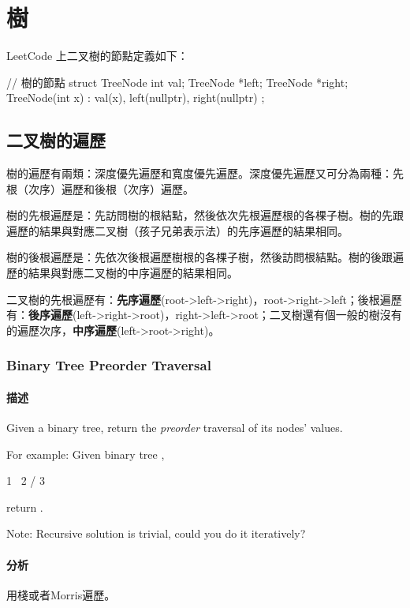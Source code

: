\chapter{樹}

LeetCode 上二叉樹的節點定義如下：
\begin{Code}
// 樹的節點
struct TreeNode {
    int val;
    TreeNode *left;
    TreeNode *right;
    TreeNode(int x) : val(x), left(nullptr), right(nullptr) { }
};
\end{Code}


\section{二叉樹的遍歷} %

樹的遍歷有兩類：深度優先遍歷和寬度優先遍歷。深度優先遍歷又可分為兩種：先根（次序）遍歷和後根（次序）遍歷。

樹的先根遍歷是：先訪問樹的根結點，然後依次先根遍歷根的各棵子樹。樹的先跟遍歷的結果與對應二叉樹（孩子兄弟表示法）的先序遍歷的結果相同。

樹的後根遍歷是：先依次後根遍歷樹根的各棵子樹，然後訪問根結點。樹的後跟遍歷的結果與對應二叉樹的中序遍歷的結果相同。

二叉樹的先根遍歷有：\textbf{先序遍歷}(root->left->right)，root->right->left；後根遍歷有：\textbf{後序遍歷}(left->right->root)，right->left->root；二叉樹還有個一般的樹沒有的遍歷次序，\textbf{中序遍歷}(left->root->right)。


\subsection{Binary Tree Preorder Traversal}
\label{sec:binary-tree-preorder-traversal}


\subsubsection{描述}
Given a binary tree, return the \emph{preorder} traversal of its nodes' values.

For example:
Given binary tree ,
\begin{Code}
 1
  \
   2
  /
 3
\end{Code}
return \code{\[1,2,3\]}.

Note: Recursive solution is trivial, could you do it iteratively?


\subsubsection{分析}
用棧或者Morris遍歷。



